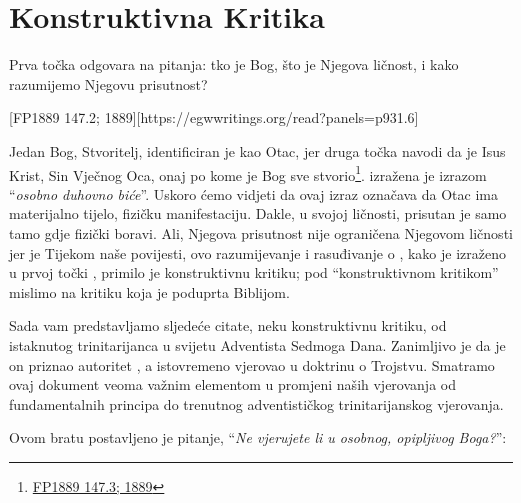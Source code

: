 \chapter{Konstruktivna Kritika}

Prva točka  odgovara na pitanja: tko je Bog, što je Njegova ličnost, i kako razumijemo Njegovu prisutnost?

[FP1889 147.2; 1889][https://egwwritings.org/read?panels=p931.6]

Jedan Bog, Stvoritelj, identificiran je kao Otac, jer druga točka  navodi da je Isus Krist, Sin Vječnog Oca, onaj po kome je Bog sve stvorio\footnote{\href{https://egwwritings.org/?ref=en_FP1889.147.3&para=931.7}{FP1889 147.3; 1889}}.  izražena je izrazom “\textit{osobno duhovno biće}”. Uskoro ćemo vidjeti da ovaj izraz označava da Otac ima materijalno tijelo, fizičku manifestaciju. Dakle, u svojoj ličnosti, prisutan je samo tamo gdje fizički boravi. Ali, Njegova prisutnost nije ograničena Njegovom ličnosti jer je  Tijekom naše povijesti, ovo razumijevanje i rasuđivanje o , kako je izraženo u prvoj točki , primilo je konstruktivnu kritiku; pod “konstruktivnom kritikom” mislimo na kritiku koja je poduprta Biblijom.

Sada vam predstavljamo sljedeće citate, neku konstruktivnu kritiku, od istaknutog trinitarijanca u svijetu Adventista Sedmoga Dana. Zanimljivo je da je on priznao autoritet , a istovremeno vjerovao u doktrinu o Trojstvu. Smatramo ovaj dokument veoma važnim elementom u promjeni naših vjerovanja od fundamentalnih principa do trenutnog adventističkog trinitarijanskog vjerovanja.

Ovom bratu postavljeno je pitanje, “\textit{Ne vjerujete li u osobnog, opipljivog Boga?}”:


